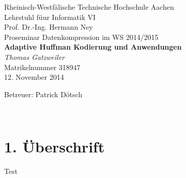 \documentclass[twoside,graphics,11pt,dvips]{article}
\theoremstyle{break}
\begin{document}
\pagestyle{empty}
\begin{center}

    Rheinisch-Westfälische Technische Hochschule Aachen \\
    Lehrstuhl füur Informatik VI \\
    Prof. Dr.-Ing. Hermann Ney\\[6ex]
    Proseminar Datenkompression im WS 2014/2015\\[12ex]

    \LARGE
    \textbf{Adaptive Huffman Kodierung und Anwendungen} \\[6ex]
    \textit{Thomas Gatzweiler} \\[6ex]
    \Large
    Matrikelnummer 318947 \\[6ex]
    12. November 2014

    \vfill
    \Large Betreuer: Patrick Dötsch
\end{center}

\newpage
\
\newpage

\section{1. Überschrift}
Test \cite{Salomon:2010}

\pagestyle{headings}
\tableofcontents
\listoftables
\listoffigures
\newpage
\pagestyle{empty}
\
\newpage
\pagestyle{headings}



\end{document}
